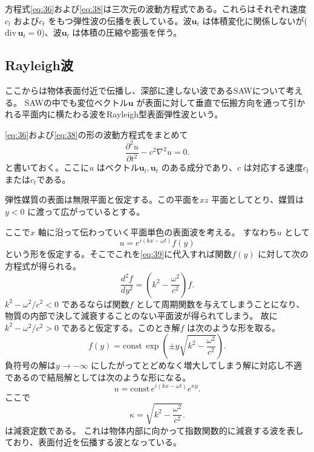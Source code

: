 \documentclass[dvipdfmx]{jsreport}
\numberwithin{equation}{chapter}
\numberwithin{table}{chapter}
\begin{document}
方程式\eqref{eq:36}および\eqref{eq:38}は三次元の波動方程式である。これらはそれぞれ速度$c_l$ および$c_t$ をもつ弾性波の伝播を表している。波$\bm{u}_t$ は体積変化に関係しないが($\mathrm{div}\,\bm{u}_t=0$)、波$\bm{u}_l$ は体積の圧縮や膨張を伴う。
\subsection{Rayleigh波}
ここからは物体表面付近で伝播し、深部に達しない波であるSAWについて考える。
SAWの中でも変位ベクトル$\bm{u}$ が表面に対して垂直で伝搬方向を通って引かれる平面内に横たわる波をRayleigh型表面弾性波という。

\eqref{eq:36}および\eqref{eq:38}の形の波動方程式をまとめて
\begin{equation}
\label{eq:39}
	\frac{\partial ^2u}{\partial t^2} -c^2 \nabla ^2u=0
.\end{equation}
と書いておく。ここに$u$ はベクトル$\bm{u}_l,\bm{u}_t$ のある成分であり、$c$ は対応する速度$c_l$ または$c_t$である。

弾性媒質の表面は無限平面と仮定する。この平面を$xz$ 平面としてとり、媒質は$y<0$ に渡って広がっているとする。

ここで$x$ 軸に沿って伝わっていく平面単色の表面波を考える。
すなわち$u$ として
\begin{equation}
\label{eq:40}
	u=e^{i(kx-\omega t)}f(y)
\end{equation}
という形を仮定する。そこでこれを\eqref{eq:39}に代入すれば関数$f(y)$ に対して次の方程式が得られる。
\begin{equation}
\label{eq:41}
	\frac{d^2f}{dy^2}=\left( k^2-\frac{\omega^2}{c^2} \right) f
.\end{equation}
$k^2 - \omega^2 /c^2<0$ であるならば関数$f$ として周期関数を与えてしまうことになり、
物質の内部で決して減衰することのない平面波が得られてしまう。
故に$k^2 -\omega^2 /c^2>0$ であると仮定する。このとき解$f$ は次のような形を取る。
\begin{equation}
\label{eq:42}
	f(y)=\mathrm{const}\, \exp \left( \pm y\sqrt{k^2-\frac{\omega^2}{c^2}}  \right) 
.\end{equation}
負符号の解は$y\to -\infty$ にしたがってとどめなく増大してしまう解に対応し不適であるので結局解としては次のような形になる。
\begin{equation}
\label{eq:43}
	u=\mathrm{const}\,e^{i(kx-\omega t)}e^{\kappa y}
.\end{equation}
ここで
\begin{equation}
\label{eq:44}
	\kappa = \sqrt{k^2-\frac{\omega^2}{c^2}} 
.\end{equation}
は減衰定数である。
これは物体内部に向かって指数関数的に減衰する波を表しており、表面付近を伝播する波となっている。
\end{document}
